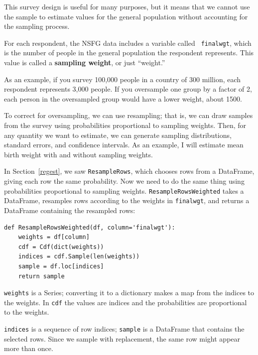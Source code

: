 \documentclass[12pt]{book}
\theoremstyle{exercise}
\begin{document}
This survey design is useful for many purposes, but it means that we
cannot use the sample to estimate values for the general
population without accounting for the sampling process.

For each respondent, the NSFG data includes a variable called {\tt
  finalwgt}, which is the number of people in the general population
the respondent represents.  This value is called a {\bf sampling
  weight}, or just ``weight.''%
%
%
%

As an example, if you survey 100,000 people in a country of 300
million, each respondent represents 3,000 people.  If you oversample
one group by a factor of 2, each person in the oversampled
group would have a lower weight, about 1500.

To correct for oversampling, we can use resampling; that is, we
can draw samples from the survey using probabilities proportional
to sampling weights.  Then, for any quantity we want to estimate, we can
generate sampling distributions, standard errors, and confidence
intervals.  As an example, I will estimate mean birth weight with
and without sampling weights.%
%
%
%
%
%

In Section~\ref{regest}, we saw {\tt ResampleRows}, which chooses
rows from a DataFrame, giving each row the same probability.
Now we need to do the same thing using probabilities
proportional to sampling weights.
{\tt ResampleRowsWeighted} takes a DataFrame, resamples rows according
to the weights in {\tt finalwgt}, and returns a DataFrame containing
the resampled rows:%
%

\begin{verbatim}
def ResampleRowsWeighted(df, column='finalwgt'):
    weights = df[column]
    cdf = Cdf(dict(weights))
    indices = cdf.Sample(len(weights))
    sample = df.loc[indices]
    return sample
\end{verbatim}

{\tt weights} is a Series; converting it to a dictionary makes
a map from the indices to the weights.  In {\tt cdf} the values
are indices and the probabilities are proportional to the
weights.

{\tt indices} is a sequence of row indices; {\tt sample} is a
DataFrame that contains the selected rows.  Since we sample with
replacement, the same row might appear more than once.%
%
\end{document}
